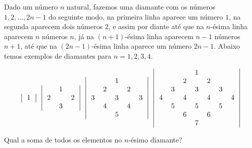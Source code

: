 Dado um número $n$ natural, fazemos uma diamante com os números $1, 2, \dots, 2n - 1$ do seguinte modo,
na primeira linha aparece um número $1$, na segunda aparecem dois números $2$, e assim por diante até que na $n$-ésima linha aparecem $n$ números $n$, já na $(n+1)$-ésima linha aparecem $n - 1$ números $n + 1$, até que na $(2n - 1)$-ésima linha aparece um número $2n - 1$.
Abaixo temos exemplos de diamantes para $n = 1, 2, 3, 4$.

\[
\left|
\begin{tabular}{c}
	1
\end{tabular}
\right|\ 
\left|
\begin{tabular}{ccc}
	 &1&  \\
	2& &2 \\
	 &3&  
\end{tabular}
\right|\ 
\left|
\begin{tabular}{ccccc}
	 & &1& &  \\
	 &2& &2&  \\
	3& &3& &3 \\
	 &4& &4&  \\
	 & &5& &  
\end{tabular}
\right|\ 
\left|
\begin{tabular}{ccccccc}
	 & & &1& & &  \\
	 & &2& &2& &  \\
	 &3& &3& &3&  \\
	4& &4& &4& &4 \\
	 &5& &5& &5&  \\
	 & &6& &6& &  \\
	 & & &7& & &  \\
\end{tabular}
\right|
\]

Qual a soma de todos os elementos no $n$-ésimo diamante?
